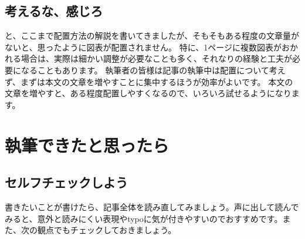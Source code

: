 \begin{table}[htb]
  \caption{よく使う配置命令の一覧}
  \label{htbp}
  \begin{center}
    \end{center}
\end{table}

\subsection{考えるな、感じろ}
と、ここまで配置方法の解説を書いてきましたが、そもそもある程度の文章量がないと、思ったように図表が配置されません。
特に、1ページに複数図表がおかれる場合は、実際は細かい調整が必要なことも多く、それなりの経験と工夫が必要になることもあります。
執筆者の皆様は記事の執筆中は配置について考えず、まずは本文の文章を増やすことに集中するほうが効率がよいです。
本文の文章を増やすと、ある程度配置しやすくなるので、いろいろ試せるようになります。

\section{執筆できたと思ったら}
\subsection{セルフチェックしよう}
書きたいことが書けたら、記事全体を読み直してみましょう。声に出して読んでみると、意外と読みにくい表現やtypoに気が付きやすいのでおすすめです。また、次の観点でもチェックしておきましょう。

